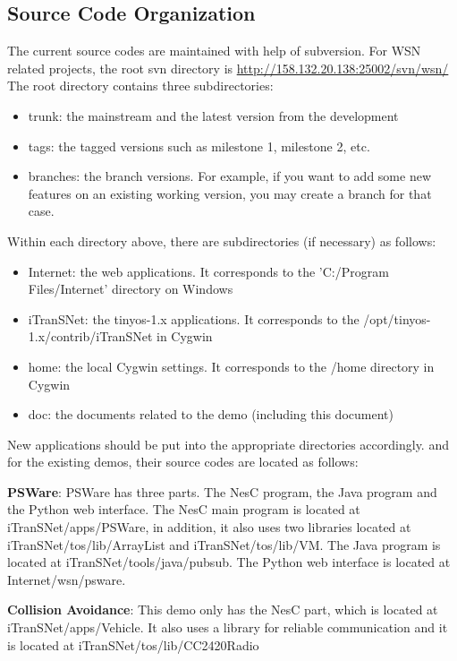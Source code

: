 \subsection{Source Code Organization}
\label{sec:source}
The current source codes are maintained with help of subversion. For WSN related projects, the root svn directory is \url{http://158.132.20.138:25002/svn/wsn/} The root directory contains three subdirectories:
\begin{itemize}
\item trunk: the mainstream and the latest version from the development
\item tags: the tagged versions such as milestone 1, milestone 2, etc.
\item branches: the branch versions. For example, if you want to add some new features on an existing working version, you may create a branch for that case.
\end{itemize}

Within each directory above, there are subdirectories (if necessary) as follows:
\begin{itemize}
\item Internet: the web applications. It corresponds to the 'C:/Program Files/Internet' directory on Windows
\item iTranSNet: the tinyos-1.x applications. It corresponds to the /opt/tinyos-1.x/contrib/iTranSNet in Cygwin
\item home: the local Cygwin settings. It corresponds to the /home directory in Cygwin
\item doc: the documents related to the demo (including this document)
\end{itemize}

New applications should be put into the appropriate directories accordingly. and for the existing demos, their source codes are located as follows:

\textbf{PSWare}: PSWare has three parts. The NesC program, the Java program and the Python web interface. The NesC main program is located at iTranSNet/apps/PSWare, in addition, it also uses two libraries located at iTranSNet/tos/lib/ArrayList and iTranSNet/tos/lib/VM. The Java program is located at iTranSNet/tools/java/pubsub. The Python web interface is located at Internet/wsn/psware.

\textbf{Collision Avoidance}: This demo only has the NesC part, which is located at iTranSNet/apps/Vehicle. It also uses a library for reliable communication and it is located at iTranSNet/tos/lib/CC2420Radio

